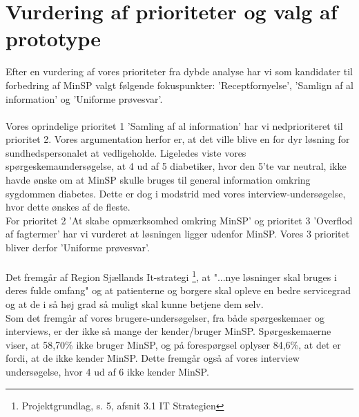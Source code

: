 \section{Vurdering af prioriteter og valg af prototype}
Efter en vurdering af vores prioriteter fra dybde analyse har vi som kandidater til forbedring af MinSP valgt følgende fokuspunkter: 'Receptfornyelse', 'Samlign af al information' og 'Uniforme prøvesvar'.
\\\\
Vores oprindelige prioritet 1 'Samling af al information' har vi nedprioriteret til prioritet 2. Vores argumentation herfor er, at det ville blive en for dyr løsning for sundhedspersonalet at vedligeholde. 
Ligeledes viste vores spørgeskemaundersøgelse, at 4 ud af 5 diabetiker, hvor den 5'te var neutral, ikke havde ønske om at MinSP skulle bruges til general information omkring sygdommen diabetes. Dette er dog i modstrid med vores interview-undersøgelse, hvor dette ønskes af de fleste.\\
For prioritet 2 'At skabe opmærksomhed omkring MinSP' og prioritet 3 'Overflod af fagtermer' har vi vurderet at løsningen ligger udenfor MinSP. Vores 3 prioritet bliver derfor 'Uniforme prøvesvar'.
\\\\
Det fremgår af Region Sjællands It-strategi \footnote{Projektgrundlag, s. 5, afsnit 3.1 IT Strategien}, at "...nye løsninger skal bruges i deres fulde omfang" og at patienterne og borgere skal opleve en bedre servicegrad og at de i så høj grad så muligt skal kunne betjene dem selv.\\
Som det fremgår af vores brugere-undersøgelser, fra både spørgeskemaer og interviews, er der ikke så mange der kender/bruger MinSP. Spørgeskemaerne viser, at 58,70\% ikke bruger MinSP, og på forespørgsel oplyser 84,6\%, at det er fordi, at de ikke kender MinSP. Dette fremgår også af vores interview undersøgelse, hvor 4 ud af 6 ikke kender MinSP.\\
